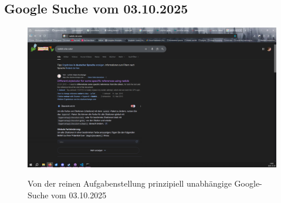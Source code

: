 \subsection{Google Suche vom 03.10.2025}
\begin{figure}[h!tb]
    \centering
    \caption{Von der reinen Aufgabenstellung prinzipiell unabhängige Google-Suche vom 03.10.2025}
    \includegraphics[width=\textwidth]{pictures/motivation.PNG}\label{fig:googlemakesmistakes}
\end{figure}